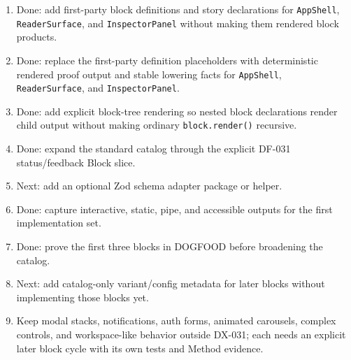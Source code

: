 \begin{enumerate}
  Done: add adapter-first \texttt{d\allowbreak{}e\allowbreak{}f\allowbreak{}i\allowbreak{}n\allowbreak{}e\allowbreak{}S\allowbreak{}c\allowbreak{}h\allowbreak{}e\allowbreak{}m\allowbreak{}a\allowbreak{}B\allowbreak{}l\allowbreak{}o\allowbreak{}c\allowbreak{}k\allowbreak{}(\allowbreak{})} support without making Zod, provider lifecycle, AppShell rendering, or DOGFOOD proof part of the core schema-bound block contract.
\item
  Done: add first-party block definitions and story declarations for \texttt{A\allowbreak{}p\allowbreak{}p\allowbreak{}S\allowbreak{}h\allowbreak{}e\allowbreak{}l\allowbreak{}l}, \texttt{R\allowbreak{}e\allowbreak{}a\allowbreak{}d\allowbreak{}e\allowbreak{}r\allowbreak{}S\allowbreak{}u\allowbreak{}r\allowbreak{}f\allowbreak{}a\allowbreak{}c\allowbreak{}e}, and \texttt{I\allowbreak{}n\allowbreak{}s\allowbreak{}p\allowbreak{}e\allowbreak{}c\allowbreak{}t\allowbreak{}o\allowbreak{}r\allowbreak{}P\allowbreak{}a\allowbreak{}n\allowbreak{}e\allowbreak{}l} without making them rendered block products.
\item
  Done: replace the first-party definition placeholders with deterministic rendered proof output and stable lowering facts for \texttt{A\allowbreak{}p\allowbreak{}p\allowbreak{}S\allowbreak{}h\allowbreak{}e\allowbreak{}l\allowbreak{}l}, \texttt{R\allowbreak{}e\allowbreak{}a\allowbreak{}d\allowbreak{}e\allowbreak{}r\allowbreak{}S\allowbreak{}u\allowbreak{}r\allowbreak{}f\allowbreak{}a\allowbreak{}c\allowbreak{}e}, and \texttt{I\allowbreak{}n\allowbreak{}s\allowbreak{}p\allowbreak{}e\allowbreak{}c\allowbreak{}t\allowbreak{}o\allowbreak{}r\allowbreak{}P\allowbreak{}a\allowbreak{}n\allowbreak{}e\allowbreak{}l}.
\item
  Done: add explicit block-tree rendering so nested block declarations render child output without making ordinary \texttt{b\allowbreak{}l\allowbreak{}o\allowbreak{}c\allowbreak{}k\allowbreak{}.\allowbreak{}r\allowbreak{}e\allowbreak{}n\allowbreak{}d\allowbreak{}e\allowbreak{}r\allowbreak{}(\allowbreak{})} recursive.
\item
  Done: expand the standard catalog through the explicit DF-031 status/feedback Block slice.
\item
  Next: add an optional Zod schema adapter package or helper.
\item
  Done: capture interactive, static, pipe, and accessible outputs for the first implementation set.
\item
  Done: prove the first three blocks in DOGFOOD before broadening the catalog.
\item
  Next: add catalog-only variant/config metadata for later blocks without implementing those blocks yet.
\item
  Keep modal stacks, notifications, auth forms, animated carousels, complex controls, and workspace-like behavior outside DX-031; each needs an explicit later block cycle with its own tests and Method evidence.
\end{enumerate}

